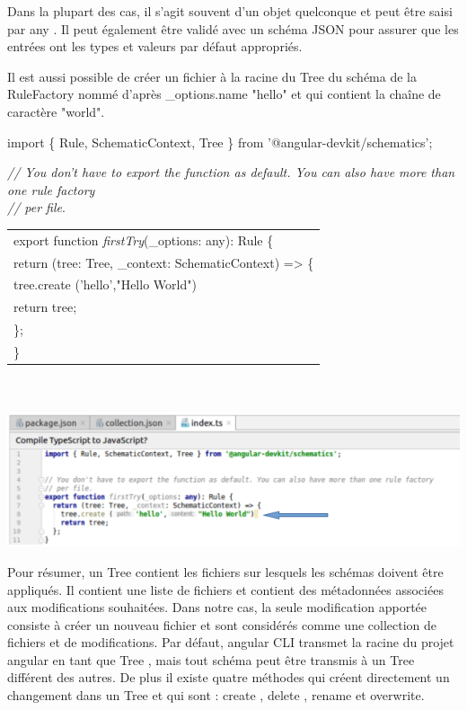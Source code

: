 \documentclass[12pt,french]{article}
\begin{document}
	Dans la plupart des cas, il s’agit souvent d’un objet quelconque et peut être saisi par any . Il peut également être validé avec un schéma JSON pour assurer que les entrées ont les types et valeurs par défaut appropriés.\newline
	
	Il est aussi possible de créer un fichier à la racine du Tree du schéma de la RuleFactory nommé d'après \_options.name "hello" et qui contient la chaîne de caractère "world". \newline
	
	import \{ Rule, SchematicContext, Tree \} from '@angular-devkit/schematics';\newline
	
	\textit{// You don't have to export the function as default. You can also have more than one rule factory}\\
	\textit{// per file}.
\newline
	
		\begin{tabular}{l}
		export function \textit{firstTry}(\_options: any): Rule \{ \\
			\quad return (tree: Tree, \_context: SchematicContext) => \{ \\
				\qquad tree.create ('hello',"Hello World")\\
				\qquad return tree;\\
			\quad\};
\\
		\}
	\end{tabular}\break\\
	\\
	\includegraphics[scale=0.65]{2.jpg}

	Pour résumer, un Tree contient les fichiers sur lesquels les schémas doivent être appliqués. Il contient une liste de fichiers et contient des métadonnées associées aux modifications souhaitées. Dans notre cas, la seule modification apportée consiste à créer un nouveau fichier et sont considérés comme une collection de fichiers et de modifications.\newline
	Par défaut, angular CLI transmet la racine du projet angular en tant que Tree , mais tout schéma peut être transmis à un Tree différent des autres. De plus il existe quatre méthodes qui créent directement un changement dans un Tree et qui sont : create , delete , rename et overwrite.\newline
	
\end{document}
